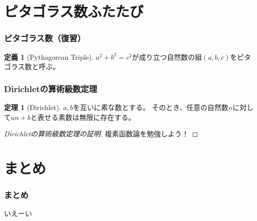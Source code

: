 \documentclass[dvipdfmx,11pt,notheorems]{beamer}
\theoremstyle{definition}
\newtheorem{theorem}{定理}
\newtheorem{definition}{定義}
\begin{document}
\section{ピタゴラス数ふたたび}

\begin{frame}\frametitle{ピタゴラス数（復習）}

\begin{definition}[Pythagorean Triple]
$a^{2} + b^{2} = c^{2}$が成り立つ自然数の組$(a, b, c)$をピタゴラス数と呼ぶ。
\end{definition}

\end{frame}


\begin{frame}\frametitle{Dirichletの算術級数定理}

\begin{theorem}[Dirichlet]
$a,b$を互いに素な数とする。
そのとき、任意の自然数$n$に対して$an + b$と表せる素数は無限に存在する。
\end{theorem}

\begin{proof}[Dirichletの算術級数定理の証明]
複素函数論を勉強しよう！
\end{proof}

\end{frame}

\section{まとめ}

\begin{frame}\frametitle{まとめ}
いえーい
\end{frame}
\end{document}
